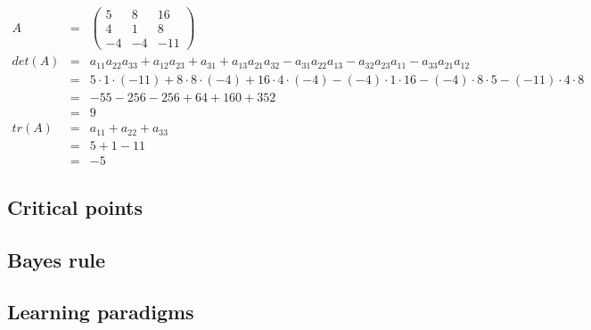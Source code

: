 \documentclass[11pt,a4paper]{article}
\begin{document}
\begin{eqnarray*}
A   &   = & \begin{pmatrix}
  5 &   8 &  16\\
  4 &   1 &   8\\
 -4 &  -4 & -11
\end{pmatrix}\\
det(A)  &   = & a_{11} a_{22} a_{33} + a_{12} a_{23} + a_{31} + a_{13} a_{21} a_{32}
            - a_{31} a_{22} a_{13} - a_{32} a_{23} a_{11} - a_{33} a_{21} a_{12}\\
        &   = & 5 \cdot 1 \cdot (-11) + 8 \cdot 8 \cdot (-4) + 16 \cdot 4 \cdot (-4)
            - (-4) \cdot 1 \cdot 16 - (-4) \cdot 8 \cdot 5 - (-11) \cdot 4 \cdot 8\\
        &   = & -55 - 256 - 256 + 64 + 160 + 352\\
        &   = & 9\\
tr(A)   &   = & a_{11} + a_{22} + a_{33}\\
        &   = & 5 + 1 - 11\\
        &   = & -5
\end{eqnarray*}

\subsection{Critical points}

\subsection{Bayes rule}

\subsection{Learning paradigms}
\end{document}
